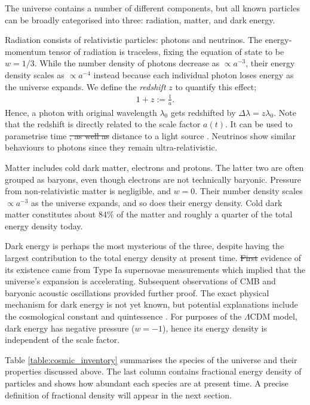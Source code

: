 \documentclass[a4paper,12pt,times,custombib,print,index]{Classes/PhDThesisPSnPDF} %
\providecommand{\DIFadd}[1]{{\protect\color{blue}\uwave{#1}}} %
\providecommand{\DIFdel}[1]{{\protect\color{red}\sout{#1}}}                      %
\providecommand{\DIFaddbegin}{} %
\providecommand{\DIFaddend}{} %
\providecommand{\DIFdelbegin}{} %
\providecommand{\DIFdelend}{} %
\newcommand{\DIFscaledelfig}{0.5}
\newlength{\DIFdelgraphicswidth} %
\newlength{\DIFdelgraphicsheight} %
\newcommand{\DIFaddincludegraphics}[2][]{{\color{blue}\fbox{\DIFOincludegraphics[#1]{#2}}}} %
\newcommand{\DIFdelincludegraphics}[2][]{%
\sbox{\DIFdelgraphicsbox}{\DIFOincludegraphics[#1]{#2}}%
\settoboxwidth{\DIFdelgraphicswidth}{\DIFdelgraphicsbox} %
\settoboxtotalheight{\DIFdelgraphicsheight}{\DIFdelgraphicsbox} %
\scalebox{\DIFscaledelfig}{%
\parbox[b]{\DIFdelgraphicswidth}{\usebox{\DIFdelgraphicsbox}\\[-\baselineskip] \rule{\DIFdelgraphicswidth}{0em}}\llap{\resizebox{\DIFdelgraphicswidth}{\DIFdelgraphicsheight}{%
\setlength{\unitlength}{\DIFdelgraphicswidth}%
\begin{picture}(1,1)%
\thicklines\linethickness{2pt} %
{\color[rgb]{1,0,0}\put(0,0){\framebox(1,1){}}}%
{\color[rgb]{1,0,0}\put(0,0){\line( 1,1){1}}}%
{\color[rgb]{1,0,0}\put(0,1){\line(1,-1){1}}}%
\end{picture}%
}\hspace*{3pt}}} %
} %
\DeclareRobustCommand{\DIFaddbegin}{\DIFOaddbegin \let\includegraphics\DIFaddincludegraphics} %
\DeclareRobustCommand{\DIFaddend}{\DIFOaddend \let\includegraphics\DIFOincludegraphics} %
\DeclareRobustCommand{\DIFdelbegin}{\DIFOdelbegin \let\includegraphics\DIFdelincludegraphics} %
\DeclareRobustCommand{\DIFdelend}{\DIFOaddend \let\includegraphics\DIFOincludegraphics} %
\begin{document}
The universe contains a number of different components, but all known particles can be broadly categorised into three: radiation, matter, and dark energy.

Radiation consists of relativistic particles: photons and neutrinos. The energy-momentum tensor of radiation is traceless, fixing the equation of state to be $w=1/3$. While the number density of photons decrease as $\propto a^{-3}$, their energy density scales as $\propto a^{-4}$ instead because each individual photon loses energy as the universe expands. We define the \textit{redshift} $z$ to quantify this effect;
\begin{align}
	1 + z := \frac{1}{a}.	\label{def:redshift}
\end{align}
Hence, a photon with original wavelength $\lambda_0$ gets redshifted by $\Delta\lambda = z \lambda_0$. Note that the redshift is directly related to the scale factor $a(t)$. It can be used to parametrise time \DIFdelbegin \DIFdel{, as well as }\DIFdelend \DIFaddbegin \DIFadd{at and }\DIFaddend distance to a light source \DIFaddbegin \DIFadd{in a model-independent way}\DIFaddend . Neutrinos show similar behaviours to photons since they remain ultra-relativistic.

Matter includes cold dark matter, electrons and protons. The latter two are often grouped as baryons, even though electrons are not technically baryonic. Pressure from non-relativistic matter is negligible, and $w = 0$. Their number density scales $\propto a^{-3}$ as the universe expands, and so does their energy density. Cold dark matter constitutes about 84\% of the matter and roughly a quarter of the total energy density today.

Dark energy is perhaps the most mysterious of the three, despite having the largest contribution to the total energy density at present time. \DIFdelbegin \DIFdel{First }\DIFdelend \DIFaddbegin \DIFadd{The first }\DIFaddend evidence of its existence came from Type Ia supernovae measurements which implied that the universe's expansion is accelerating. Subsequent observations of CMB and baryonic acoustic oscillations provided further proof. The exact physical mechanism for dark energy is not yet known, but potential explanations include the cosmological constant and quintessence \DIFaddbegin \cite{Ratra1988quintessence,Caldwell1998quintessence}\DIFaddend . For purposes of the $\Lambda$CDM model, dark energy has negative pressure ($w=-1$), hence its energy density is independent of the scale factor.

Table \ref{table:cosmic_inventory} summarises the species of the universe and their properties discussed above. The last column contains \DIFaddbegin \DIFadd{the }\DIFaddend fractional energy density of particles and shows how abundant each species are at present time. A precise definition of fractional density will appear in the next section.
\end{document}
